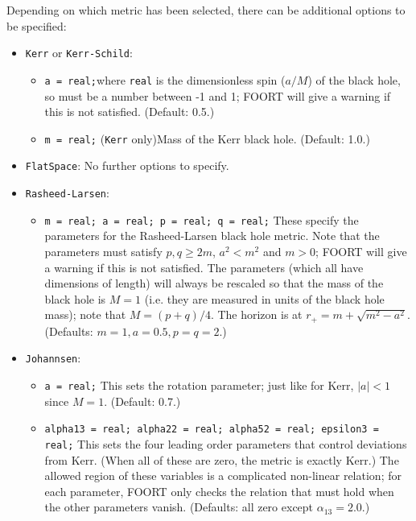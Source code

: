 \documentclass[11pt,a4paper]{article}
\newcommand{\code}[1]{{\tt #1}}
\begin{document}
Depending on which metric has been selected, there can be additional options to be specified:
\begin{itemize}
 \item \code{Kerr} or \code{Kerr-Schild}: 
 \begin{itemize}
 \item \code{a = real;}\newline where \code{real} is the dimensionless spin ($a/M$) of the black hole, so must be a number between -1 and 1; FOORT will give a warning if this is not satisfied. (Default: 0.5.)
 \item \code{m = real;} (\code{Kerr} only)\newline Mass of the Kerr black hole. (Default: 1.0.)
 \end{itemize}
 \item \code{FlatSpace}: No further options to specify.
 \item \code{Rasheed-Larsen}: 
 \begin{itemize}
 \item \code{m = real; a = real; p = real; q = real;}\newline
 These specify the parameters for the Rasheed-Larsen black hole metric. Note that the parameters must satisfy $p,q\geq 2m$, $a^2<m^2$ and $m>0$; FOORT will give a warning if this is not satisfied. The parameters (which all have dimensions of length) will always be rescaled so that the mass of the black hole is $M = 1$ (i.e. they are measured in units of the black hole mass); note that $M = (p+q)/4$.
 The horizon is at $r_+ =m + \sqrt{m^2-a^2}$. (Defaults: $m=1, a= 0.5, p=q=2$.)
 \end{itemize}
\item \code{Johannsen}: 
\begin{itemize}
\item \code{a = real;}\newline
This sets the rotation parameter; just like for Kerr, $|a|<1$ since $M=1$. (Default: 0.7.)
\item \code{alpha13 = real; alpha22 = real; alpha52 = real; epsilon3 = real;}\newline
This sets the four leading order parameters that control deviations from Kerr. (When all of these are zero, the metric is exactly Kerr.) The allowed region of these variables is a complicated non-linear relation; for each parameter, FOORT only checks the relation that must hold when the other parameters vanish. (Defaults: all zero except $\alpha_{13}=2.0$.)
\end{itemize}

\end{itemize}
\end{document}

